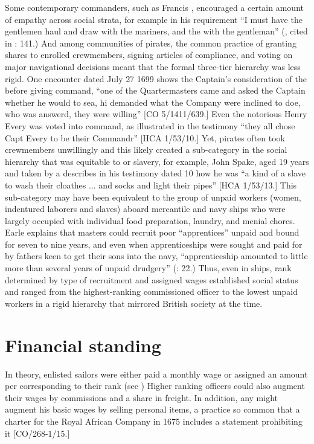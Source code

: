 Some contemporary commanders, such as Francis , encouraged a certain amount of empathy across social strata, for example in his requirement “I must have the gentlemen haul and draw with the mariners, and the  with the gentleman” (, cited in \citealt{Bicheno2012}: 141.) And among communities of pirates, the common practice of granting shares to enrolled crewmembers, signing articles of compliance, and voting on major navigational decisions meant that the formal three-tier hierarchy was less rigid. One  encounter dated July 27 1699 shows the Captain’s consideration of the  before giving command, “one of the Quartermasters came and asked the Captain whether he would to sea, hi demanded what the Company were inclined to doe, who was answerd, they were willing” [CO 5/1411/639.] Even the notorious  Henry Every was voted into command, as illustrated in the testimony “they all chose Capt Every to be their Commandr” [HCA 1/53/10.] Yet, pirates often took crewmembers unwillingly and this likely created a sub-category in the social hierarchy that was equitable to  or slavery, for example, John Spake, aged 19 years and taken by a  describes in his testimony dated 10 \citealt{September1696} how he was “a kind of a slave to wash their cloathes ... and socks and light their pipes” [HCA 1/53/13.] This sub-category may have been equivalent to the group of unpaid workers (women, indentured laborers and slaves) aboard mercantile and navy ships who were largely occupied with individual food preparation, laundry, and menial chores.  Earle explains that masters could recruit poor “apprentices” unpaid and bound for seven to nine years, and even when apprenticeships were sought and paid for by fathers keen to get their sons into the navy, “apprenticeship amounted to little more than several years of unpaid drudgery” (\citealt{Earle1998}: 22.) Thus, even in  ships, rank determined by type of recruitment and assigned wages established social status and ranged from the highest-ranking commissioned officer to the lowest unpaid workers in a rigid hierarchy that mirrored British society at the time. 

\section{{Financial standing}}\label{sec:3.8}

In theory, enlisted sailors were either paid a monthly wage or assigned an amount per  corresponding to their rank (see ) Higher ranking officers could also augment their wages by commissions and a share in freight. In addition, any  might augment his basic wages by selling personal items, a practice so common that a charter for the Royal African Company in 1675 includes a statement prohibiting it [CO/268-1/15.]  

